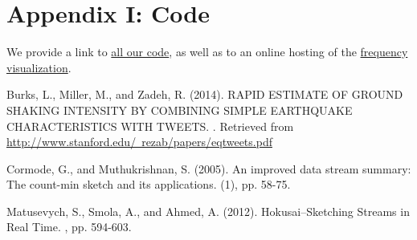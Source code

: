 \documentclass[twoside]{article}
\begin{document}
\section{Appendix I: Code} \label{sec:Appendix_code}

We provide a link to \href{https://github.com/kiranvodrahalli/cos521/}{all our code}, as well as to an online hosting of the \href{http://princeton.edu/~awlee/trend}{frequency visualization}.



\begin{thebibliography}{99} %


Burks, L., Miller, M., and Zadeh, R. (2014). 
\newblock RAPID ESTIMATE OF GROUND SHAKING INTENSITY BY COMBINING SIMPLE EARTHQUAKE CHARACTERISTICS WITH TWEETS. 
. Retrieved from \href{http://www.stanford.edu/~rezab/papers/eqtweets.pdf}{http://www.stanford.edu/~rezab/papers/eqtweets.pdf}

Cormode, G., and Muthukrishnan, S. (2005). 
\newblock An improved data stream summary: The count-min sketch and its applications. 
(1), pp. 58-75.

Matusevych, S., Smola, A., and Ahmed, A. (2012).
\newblock Hokusai--Sketching Streams in Real Time.
, pp. 594-603.


 
\end{thebibliography}

\end{document}
